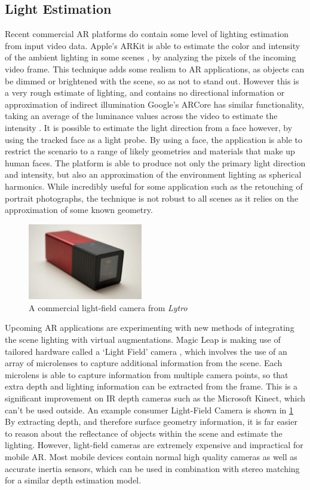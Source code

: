 \documentclass[ %
                    author={Gavin Parker},
                supervisor={Dr. Neill Campbell},
                    degree={MEng},
                     title={Deep Learning for Illumination Estimation from Stereo Images},
                  subtitle={},
                      type={Research},
                      year={2018} ]{dissertation}
\begin{document}
\subsection{Light Estimation}
Recent commercial AR platforms do contain some level of lighting estimation from input video data. Apple's ARKit is able to estimate the color and intensity of the ambient lighting in some scenes \cite{arkit1}, by analyzing the pixels of the incoming video frame. This technique adds some realism to AR applications, as objects can be dimmed or brightened with the scene, so as not to stand out. However this is a very rough estimate of lighting, and contains no directional information or approximation of indirect illumination  Google's ARCore has similar functionality, taking an average of the luminance values across the video to estimate the intensity \cite{Debevec:1998:RSO:280814.280864}. It is possible to estimate the light direction from a face \cite{DBLP:journals/corr/abs-1803-06340} however, by using the tracked face as a light probe. By using a face, the application is able to restrict the scenario to a range of likely geometries and materials that make up human faces. The platform is able to produce not only the primary light direction and intensity, but also an approximation of the environment lighting as spherical harmonics. While incredibly useful for some application such as the retouching of portrait photographs, the technique is not robust to all scenes as it relies on the approximation of some known geometry.
\begin{figure}
\includegraphics[width=5cm]{images/lytro}
\centering
\caption{A commercial light-field camera from \textit{Lytro}}
\label{fig:lytro}
\end{figure}
\newline
Upcoming AR applications are experimenting with new methods of integrating the scene lighting with virtual augmentations. Magic Leap is making use of tailored hardware called a `Light Field' camera \cite{ng2005light}, which involves the use of an array of microlenses to capture additional information from the scene. Each microlens is able to capture information from multiple camera points, so that extra depth and lighting information can be extracted from the frame. This is a significant improvement on IR depth cameras such as the Microsoft Kinect, which can't be used outside. An example consumer Light-Field Camera is shown in \ref{fig:lytro} By extracting depth, and therefore surface geometry information, it is far easier to reason about the reflectance of objects within the scene and estimate the lighting. However, light-field cameras are extremely expensive and impractical for mobile AR. Most mobile devices contain normal high quality cameras as well as accurate inertia sensors, which can be used in combination with stereo matching for a similar depth estimation model.
\end{document}
